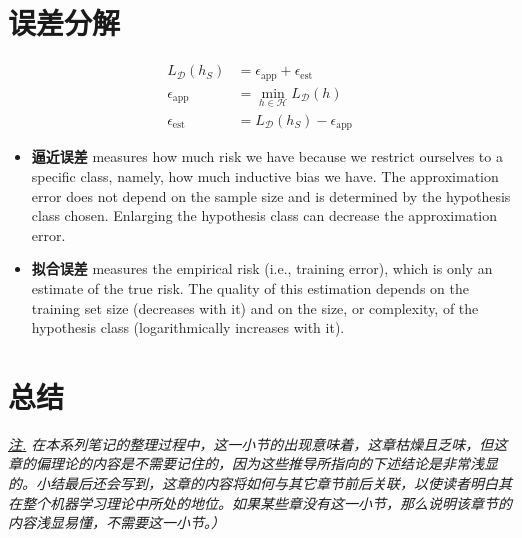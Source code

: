 \documentclass{article}
\begin{document}
\section{误差分解}

	\begin{equation}
	\begin{split}
	L_\mathcal{D}(h_S) &= \epsilon_{\mathrm{app}}+\epsilon_{\mathrm{est}} \\
	\epsilon_{\mathrm{app}} &= \min\limits_{h\in\mathcal{H}}L_\mathcal{D}(h) \\
	\epsilon_{\mathrm{est}} &= L_\mathcal{D}(h_S)-\epsilon_{\mathrm{app}}
	\end{split}
	\end{equation}		

	\begin{itemize}
	\item \textbf{逼近误差} measures how much risk we have because we restrict ourselves to a specific class, namely, how much inductive bias we have. The approximation error does not depend on the sample size and is determined by the hypothesis class chosen. Enlarging the hypothesis class can decrease the approximation error.
	\item \textbf{拟合误差} measures the empirical risk (i.e., training error), which is only an estimate of the true risk. The quality of this estimation depends on the training set size (decreases with it) and on the size, or complexity, of the hypothesis class (logarithmically increases with it).
	\end{itemize}

\section{总结}

	\vspace{2mm}
	\begin{scriptsize}
	\begin{spacing}{1.2}
	{\sffamily
	\noindent\textit{\underline{注.} 在本系列笔记的整理过程中，这一小节的出现意味着，这章枯燥且乏味，但这章的偏理论的内容是不需要记住的，因为这些推导所指向的下述结论是非常浅显的。小结最后还会写到，这章的内容将如何与其它章节前后关联，以使读者明白其在整个机器学习理论中所处的地位。如果某些章没有这一小节，那么说明该章节的内容浅显易懂，不需要这一小节。）
	}}
	\end{spacing}
	\end{scriptsize}
	\vspace{2mm}
\end{document}
